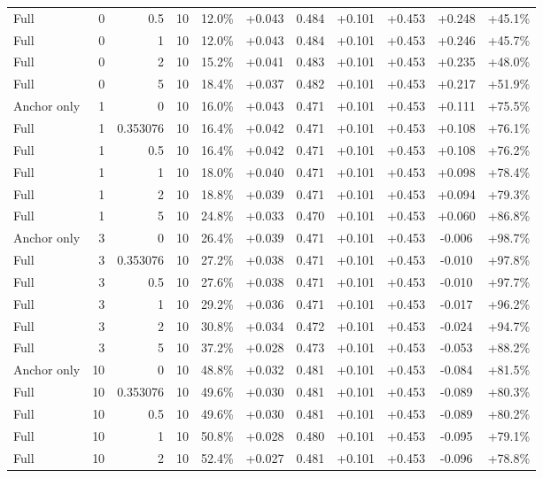 \begin{table}[htbp]
\begin{tabular}{lrrrccccccc}
Full & 0 & 0.5 & 10 & 12.0\% & +0.043 & 0.484 & +0.101 & +0.453 & +0.248 & +45.1\% \\
Full & 0 & 1 & 10 & 12.0\% & +0.043 & 0.484 & +0.101 & +0.453 & +0.246 & +45.7\% \\
Full & 0 & 2 & 10 & 15.2\% & +0.041 & 0.483 & +0.101 & +0.453 & +0.235 & +48.0\% \\
Full & 0 & 5 & 10 & 18.4\% & +0.037 & 0.482 & +0.101 & +0.453 & +0.217 & +51.9\% \\
Anchor only & 1 & 0 & 10 & 16.0\% & +0.043 & 0.471 & +0.101 & +0.453 & +0.111 & +75.5\% \\
Full & 1 & 0.353076 & 10 & 16.4\% & +0.042 & 0.471 & +0.101 & +0.453 & +0.108 & +76.1\% \\
Full & 1 & 0.5 & 10 & 16.4\% & +0.042 & 0.471 & +0.101 & +0.453 & +0.108 & +76.2\% \\
Full & 1 & 1 & 10 & 18.0\% & +0.040 & 0.471 & +0.101 & +0.453 & +0.098 & +78.4\% \\
Full & 1 & 2 & 10 & 18.8\% & +0.039 & 0.471 & +0.101 & +0.453 & +0.094 & +79.3\% \\
Full & 1 & 5 & 10 & 24.8\% & +0.033 & 0.470 & +0.101 & +0.453 & +0.060 & +86.8\% \\
Anchor only & 3 & 0 & 10 & 26.4\% & +0.039 & 0.471 & +0.101 & +0.453 & -0.006 & +98.7\% \\
Full & 3 & 0.353076 & 10 & 27.2\% & +0.038 & 0.471 & +0.101 & +0.453 & -0.010 & +97.8\% \\
Full & 3 & 0.5 & 10 & 27.6\% & +0.038 & 0.471 & +0.101 & +0.453 & -0.010 & +97.7\% \\
Full & 3 & 1 & 10 & 29.2\% & +0.036 & 0.471 & +0.101 & +0.453 & -0.017 & +96.2\% \\
Full & 3 & 2 & 10 & 30.8\% & +0.034 & 0.472 & +0.101 & +0.453 & -0.024 & +94.7\% \\
Full & 3 & 5 & 10 & 37.2\% & +0.028 & 0.473 & +0.101 & +0.453 & -0.053 & +88.2\% \\
Anchor only & 10 & 0 & 10 & 48.8\% & +0.032 & 0.481 & +0.101 & +0.453 & -0.084 & +81.5\% \\
Full & 10 & 0.353076 & 10 & 49.6\% & +0.030 & 0.481 & +0.101 & +0.453 & -0.089 & +80.3\% \\
Full & 10 & 0.5 & 10 & 49.6\% & +0.030 & 0.481 & +0.101 & +0.453 & -0.089 & +80.2\% \\
Full & 10 & 1 & 10 & 50.8\% & +0.028 & 0.480 & +0.101 & +0.453 & -0.095 & +79.1\% \\
Full & 10 & 2 & 10 & 52.4\% & +0.027 & 0.481 & +0.101 & +0.453 & -0.096 & +78.8\% \\

\end{tabular}
\end{table}
